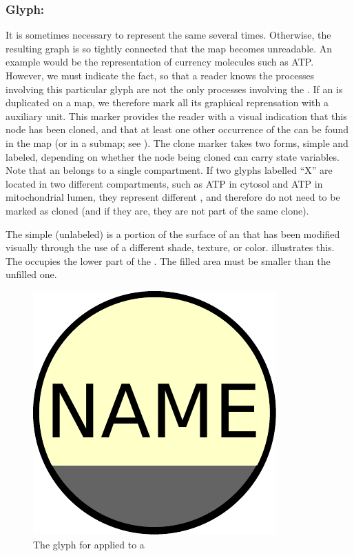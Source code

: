 \subsubsection{Glyph: }
\label{sec:cloneMarker}

It is sometimes necessary to represent the same  several times. Otherwise, the resulting graph is so tightly connected that the map becomes unreadable. An example would be the representation of currency molecules such as ATP. However, we must indicate the fact, so that a reader knows the processes involving this particular glyph are not the only processes involving the . If an  is duplicated on a map, we therefore mark all its graphical reprensation with a  auxiliary unit.  This marker provides the reader with a visual indication that this node has been cloned, and that at least one other occurrence of the  can be found in the map (or in a submap; see ).  The clone marker takes two forms, simple and labeled, depending on whether the node being cloned can carry state variables. Note that an  belongs to a single compartment. If two glyphs labelled ``X'' are located in two different compartments, such as ATP in cytosol and ATP in mitochondrial lumen, they represent different , and therefore do not need to be marked as cloned (and if they are, they are not part of the same clone).

The simple (unlabeled)  is a portion of the surface of an  that has been modified visually through the use of a different shade, texture, or color.   illustrates this. The  occupies the lower part of the . The filled area must be smaller than the unfilled one.

\begin{figure}[htb]
  \centering
  \includegraphics[scale = 0.3]{le_images/simpleCloneMarker}
  \caption{The \PD glyph for  applied to a }
  \label{fig:simpleCloneMarker}
\end{figure}

